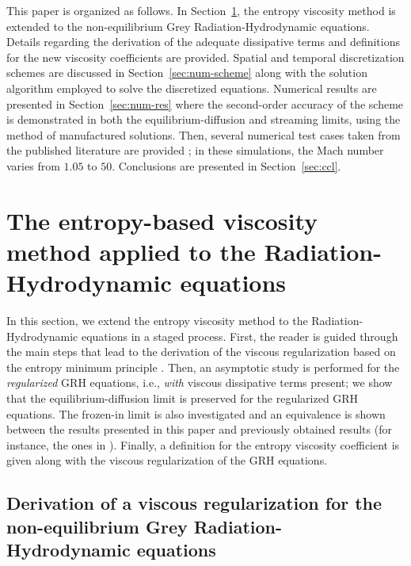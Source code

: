 \documentclass[review]{elsarticle}
\newcommand{\sect}[1]{Section~\ref{#1}}                     %
\begin{document}
This paper is organized as follows. In \sect{sec:entropy-visc-meth}, the entropy viscosity method is extended to the non-equilibrium Grey Radiation-Hydrodynamic equations. Details regarding the derivation of the adequate dissipative terms and definitions for the new viscosity coefficients are provided. Spatial and temporal discretization schemes are discussed in \sect{sec:num-scheme} along with the solution algorithm employed to solve the discretized equations. Numerical results are presented in \sect{sec:num-res} where the second-order accuracy of the scheme is demonstrated in both the equilibrium-diffusion and streaming limits, using the method of manufactured solutions. Then, several numerical test cases taken from the published literature are provided \cite{LowrieEdwards}; in these simulations, the Mach number varies from $1.05$ to $50$. Conclusions are presented in \sect{sec:ccl}.

\section{The entropy-based viscosity method applied to the Radiation-Hydrodynamic equations}
\label{sec:entropy-visc-meth}

In this section, we extend the entropy viscosity method \cite{jlg1, jlg2, valentin} to the Radiation-Hydrodynamic equations in a staged process. First, the reader is guided through the main steps that lead to the derivation of the viscous regularization based on the entropy minimum principle \cite{entropy}. Then, an asymptotic study is performed for the {\it regularized} GRH equations, i.e., {\it with} viscous dissipative terms present; we show that the equilibrium-diffusion limit is preserved for the regularized GRH equations. The frozen-in limit is also investigated and an equivalence is shown between the results presented in this paper and previously obtained results (for instance, the ones in \cite{LowrieMorel}). Finally, a definition for the entropy viscosity coefficient is given along with the viscous regularization of the GRH equations.
 
\subsection{Derivation of a viscous regularization for the non-equilibrium Grey Radiation-Hydrodynamic equations}\label{sec:visc-reg}
\end{document}
